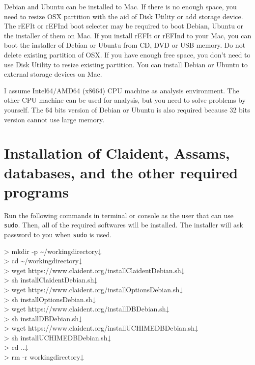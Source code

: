 \documentclass[titlepage,10pt,a4paper,english]{jsbook}
\newenvironment{cmd}{\begin{oframed}\raggedright\ttfamily\footnotesize\setlength{\baselineskip}{1.4em}}{\end{oframed}\vspace{-1em}}
\begin{document}
Debian and Ubuntu can be installed to Mac.
If there is no enough space, you need to resize OSX partition with the aid of Disk Utility or add storage device.
The rEFIt or rEFInd boot selecter may be required to boot Debian, Ubuntu or the installer of them on Mac.
If you install rEFIt or rEFInd to your Mac, you can boot the installer of Debian or Ubuntu from CD, DVD or USB memory.
Do not delete existing partition of OSX.
If you have enough free space, you don't need to use Disk Utility to resize existing partition.
You can install Debian or Ubuntu to external storage devices on Mac.

I assume Intel64/AMD64 (x86{\textunderscore}64) CPU machine as analysis environment.
The other CPU machine can be used for analysis, but you need to solve problems by yourself.
The 64 bits version of Debian or Ubuntu is also required because 32 bits version cannot use large memory.

\section{Installation of Claident, Assams, databases, and the other required programs}

Run the following commands in terminal or console as the user that can use \texttt{sudo}.
Then, all of the required softwares will be installed.
The installer will ask password to you when \texttt{sudo} is used.

\begin{cmd}
{\textgreater} mkdir -p {\textasciitilde}/workingdirectory↓\\
{\textgreater} cd {\textasciitilde}/workingdirectory↓\\
{\textgreater} wget https://www.claident.org/installClaident{\textunderscore}Debian.sh↓\\
{\textgreater} sh installClaident{\textunderscore}Debian.sh↓\\
{\textgreater} wget https://www.claident.org/installOptions{\textunderscore}Debian.sh↓\\
{\textgreater} sh installOptions{\textunderscore}Debian.sh↓\\
{\textgreater} wget https://www.claident.org/installDB{\textunderscore}Debian.sh↓\\
{\textgreater} sh installDB{\textunderscore}Debian.sh↓\\
{\textgreater} wget https://www.claident.org/installUCHIMEDB{\textunderscore}Debian.sh↓\\
{\textgreater} sh installUCHIMEDB{\textunderscore}Debian.sh↓\\
{\textgreater} cd ..↓\\
{\textgreater} rm -r workingdirectory↓
\end{cmd}
\end{document}
